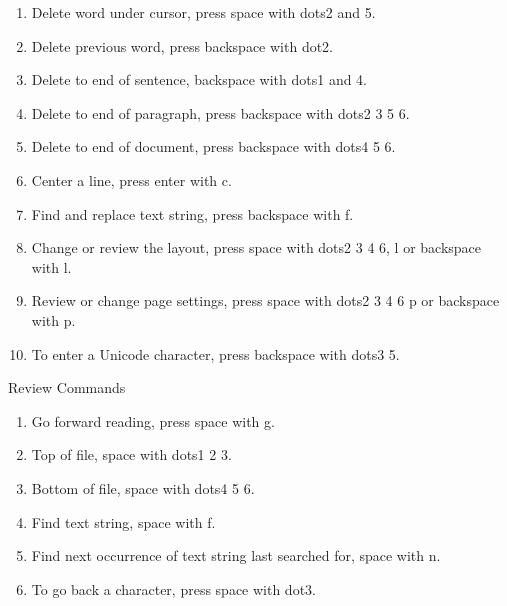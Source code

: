 \documentclass[10pt,letterpaper,twoside]{report}
\begin{document}
{{{{\begin{enumerate}
	\item Delete word under cursor, press space with dots2 and 5.
	      
	\item Delete previous word, press backspace with dot2.
	      
	\item Delete to end of sentence, backspace with dots1 and 4.
	      
	\item Delete to end of paragraph, press backspace with dots2 3 5 6.
	      
	\item Delete to end of document, press backspace with dots4 5 6.
	      
	\item Center a line, press enter with c.
	      
	\item Find and replace text string, press backspace with f.
	      
	\item Change or review the layout, press space with dots2 3 4 6, l or backspace with l.
	      
	\item Review or change page settings, press space with dots2 3 4 6 p or backspace with p.
	      
	\item To enter a Unicode character, press backspace with dots3 5.
\end{enumerate}



Review Commands



\begin{enumerate}
	\item Go forward reading, press space with g.
	      
	\item Top of file, space with dots1 2 3.
	      
	\item Bottom of file, space with dots4 5 6.
	      
	\item Find text string, space with f.
	      
	\item Find next occurrence of text string last searched for, space with n.
	      
	\item To go back a character, press space with dot3.
	      

\end{enumerate}}}}}
\end{document}
